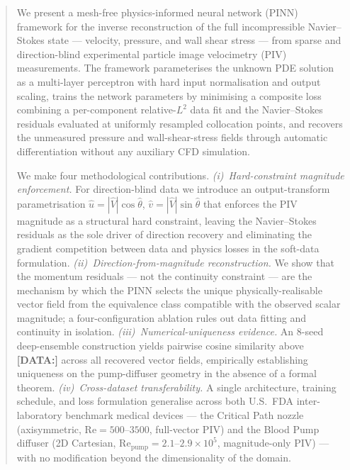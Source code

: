 \documentclass[12pt,a4paper]{article}
\newcommand{\DATA}[1]{{\color{orange}\textbf{[DATA:\;#1]}}}
\newcommand{\Reyn}{\mathrm{Re}}    %
\begin{document}
\begin{abstract}
\noindent
We present a mesh-free physics-informed neural network (PINN)
framework for the inverse reconstruction of the full incompressible
Navier--Stokes state --- velocity, pressure, and wall shear stress
--- from sparse and direction-blind experimental particle image
velocimetry (PIV) measurements. The framework parameterises the
unknown PDE solution as a multi-layer perceptron with hard input
normalisation and output scaling, trains the network parameters
by minimising a composite loss combining a per-component
relative-$L^2$ data fit and the Navier--Stokes residuals evaluated
at uniformly resampled collocation points, and recovers the
unmeasured pressure and wall-shear-stress fields through automatic
differentiation without any auxiliary CFD simulation.

We make four methodological contributions.
\emph{(i)~Hard-constraint magnitude enforcement.} For
direction-blind data we introduce an output-transform
parametrisation $\hat{u} = |\hat{V}|\cos\hat{\theta}$,
$\hat{v} = |\hat{V}|\sin\hat{\theta}$ that enforces the PIV
magnitude as a structural hard constraint, leaving the
Navier--Stokes residuals as the sole driver of direction recovery
and eliminating the gradient competition between data and physics
losses in the soft-data formulation.
\emph{(ii)~Direction-from-magnitude reconstruction.} We show that
the momentum residuals --- not the continuity constraint --- are
the mechanism by which the PINN selects the unique
physically-realisable vector field from the equivalence class
compatible with the observed scalar magnitude; a four-configuration
ablation rules out data fitting and continuity in isolation.
\emph{(iii)~Numerical-uniqueness evidence.} An $8$-seed
deep-ensemble construction yields pairwise cosine similarity above
\DATA{[abs.cossim-min]} across all recovered vector fields,
empirically establishing uniqueness on the pump-diffuser geometry
in the absence of a formal theorem.
\emph{(iv)~Cross-dataset transferability.} A single architecture,
training schedule, and loss formulation generalise across both
U.S.\ FDA inter-laboratory benchmark medical devices --- the
Critical Path nozzle (axisymmetric, $\Reyn = 500$--$3500$,
full-vector PIV) and the Blood Pump diffuser (2D Cartesian,
$\Reyn_{\text{pump}} = 2.1$--$2.9 \times 10^5$, magnitude-only
PIV) --- with no modification beyond the dimensionality of the
domain.


\end{abstract}
\end{document}
